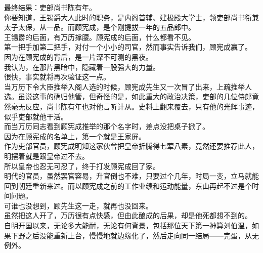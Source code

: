 \begin{multicols}{\theparacolNo}
最终结果：吏部尚书陈有年。\\

你要知道，王锡爵大人此时的职务，是内阁首辅、建极殿大学士，领吏部尚书衔兼太子太保，从一品。而顾宪成，是个刚提拔一年的五品郎中。\\

王锡爵的后面，有万历撑腰。顾宪成的后面，什么都看不见。\\

第一把手加第二把手，对付一个小小的司官，然而事实告诉我们，顾宪成赢了。\\

因为在顾宪成的背后，是一片深不可测的黑夜。\\

我认为，在那片黑暗中，隐藏着一股强大的力量。\\

很快，事实就将再次验证这一点。\\

当万历下令大臣推举入阁人选的时候，顾宪成先生又一次冒了出来，上疏推举人选。虽说这事的确归他管，但奇怪的是，如此重大的政治决策，吏部的几位侍郎竟然毫无反应，尚书陈有年也对他言听计从。史料上翻来覆去，只有他的光辉事迹，似乎吏部就他干活。\\

而当万历同志看到顾宪成推举的那个名字时，差点没把桌子掀了。\\

因为在顾宪成的名单上，第一个就是王家屏。\\

作为吏部官员，顾宪成明知这家伙曾把皇帝折腾得七荤八素，竟然还要推荐此人，明摆着就是跟皇帝过不去。\\

所以皇帝也忍无可忍了，终于打发顾宪成回了家。\\

明代的官员，虽然罢官容易，升官倒也不难，只要过个几年，时局一变，立马就能回到朝廷重新来过。而以顾宪成之前的工作业绩和运动能量，东山再起不过是个时间问题。\\

可谁也没想到，顾先生这一走，就再也没回来。\\

虽然把这人开了，万历很有点快感，但由此酿成的后果，却是他死都想不到的。\\

自明开国以来，无论多大能耐，无论有何背景，包括那位天下第一神算刘伯温，如果下野之后没能重新上台，慢慢地就边缘化了，然后走向同一结局——完蛋，从无例外。\\


\end{multicols}
